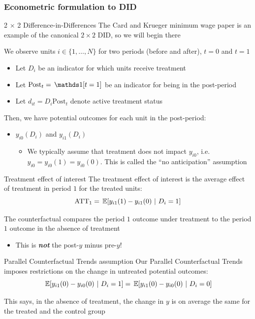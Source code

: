 \documentclass[aspectratio=169,t,11pt,table]{beamer}
\begin{document}
\subsubsection{Econometric formulation to DID}

\begin{frame}{2 $\times$ 2 Difference-in-Differences}
  The Card and Krueger minimum wage paper is an example of the canonical $2 \times 2$ DID, so we will begin there
  
  \bigskip
  We observe units $i \in \{ 1, \dots, N \}$ for two periods (before and after), $t = 0$ and $t = 1$
  \begin{itemize}
    \item Let $D_i$ be an indicator for which units receive treatment
    \item Let $\text{Post}_t = \one{t = 1}$ be an indicator for being in the post-period
    \item Let $d_{it} = D_i\text{Post}_t$ denote active treatment status
  \end{itemize}


  \pause
  \bigskip
  Then, we have potential outcomes for each unit in the post-period:
  \begin{itemize}
    \item $y_{i0}(D_i)$ and $y_{i1}(D_i)$
    \begin{itemize}
      \item We typically assume that treatment does not impact $y_{i0}$, i.e. $y_{i0} = y_{i0}(1) = y_{i0}(0)$. This is called the ``no anticipation'' assumption
    \end{itemize}
  \end{itemize}  
\end{frame}

\begin{frame}{Treatment effect of interest}
  The treatment effect of interest is the average effect of treatment in period $1$ for the treated units:
  $$
    \text{ATT}_1 = \expec{y_{i1}(1) - y_{i1}(0)}{D_i = 1}
  $$
  
  The counterfactual compares the period $1$ outcome under treatment to the period $1$ outcome in the absence of treatment
  \begin{itemize}
    \item {\color{red} This is \emph{\textbf{not}} the post-$y$ minus pre-$y$!}
  \end{itemize}
\end{frame}

\begin{frame}{Parallel Counterfactual Trends assumption}
  Our \alert{Parallel Counterfactual Trends} imposes restrictions on the change in untreated potential outcomes:
  $$
    \expec{y_{i1}(0) - y_{i0}(0)}{D_i = 1} = \expec{y_{i1}(0) - y_{i0}(0)}{D_i = 0} 
  $$

  \bigskip
  This says, in the absence of treatment, the change in $y$ is on average the same for the treated and the control group
\end{frame}
\end{document}
